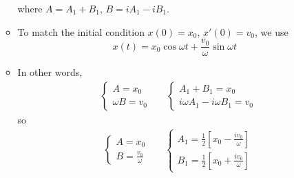 \documentclass[../notes.tex]{subfiles}
\begin{document}
\begin{itemize}
\begin{itemize}
        where $A=A_1+B_1$, $B=iA_1-iB_1$.
        \item To match the initial condition $x(0)=x_0$, $x'(0)=v_0$, we use
        \begin{equation*}
            x(t) = x_0\cos\omega t+\frac{v_0}{\omega}\sin\omega t
        \end{equation*}
        \item In other words,
        \begin{align*}
            &
            \begin{cases}
                A=x_0\\
                \omega B=v_0
            \end{cases}
            &&
            \begin{cases}
                A_1+B_1=x_0\\
                i\omega A_1-i\omega B_1=v_0
            \end{cases}
        \end{align*}
        so
        \begin{align*}
            &
            \begin{cases}
                A=x_0\\
                B=\frac{v_0}{\omega}
            \end{cases}
            &&
            \begin{cases}
                A_1=\frac{1}{2}\left[ x_0-\frac{iv_0}{\omega} \right]\\
                B_1=\frac{1}{2}\left[ x_0+\frac{iv_0}{\omega} \right]
            \end{cases}
        \end{align*}
    \end{itemize}
\end{itemize}
\end{document}
